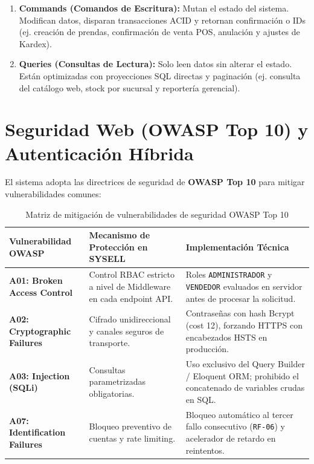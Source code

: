 \begin{enumerate}
    \item \textbf{Commands (Comandos de Escritura):} Mutan el estado del sistema. Modifican datos, disparan transacciones ACID y retornan confirmación o IDs (ej. creación de prendas, confirmación de venta POS, anulación y ajustes de Kardex).
    \item \textbf{Queries (Consultas de Lectura):} Solo leen datos sin alterar el estado. Están optimizadas con proyecciones SQL directas y paginación (ej. consulta del catálogo web, stock por sucursal y reportería gerencial).
\end{enumerate}

\section{Seguridad Web (OWASP Top 10) y Autenticación Híbrida}
El sistema adopta las directrices de seguridad de \textbf{OWASP Top 10} para mitigar vulnerabilidades comunes:

\begin{table}[H]
\centering
\small
\begin{tabularx}{\textwidth}{>{\bfseries}p{3.8cm} >{\raggedright}p{4.8cm} Y}
\toprule
\textbf{Vulnerabilidad OWASP} & \textbf{Mecanismo de Protección en SYSELL} & \textbf{Implementación Técnica} \\
\midrule
A01: Broken Access Control & Control RBAC estricto a nivel de Middleware en cada endpoint API. & Roles \texttt{ADMINISTRADOR} y \texttt{VENDEDOR} evaluados en servidor antes de procesar la solicitud. \\
\addlinespace
A02: Cryptographic Failures & Cifrado unidireccional y canales seguros de transporte. & Contraseñas con hash Bcrypt (cost 12), forzando HTTPS con encabezados HSTS en producción. \\
\addlinespace
A03: Injection (SQLi) & Consultas parametrizadas obligatorias. & Uso exclusivo del Query Builder / Eloquent ORM; prohibido el concatenado de variables crudas en SQL. \\
\addlinespace
A07: Identification Failures & Bloqueo preventivo de cuentas y rate limiting. & Bloqueo automático al tercer fallo consecutivo (\texttt{RF-06}) y acelerador de retardo en reintentos. \\
\bottomrule
\end{tabularx}
\caption{Matriz de mitigación de vulnerabilidades de seguridad OWASP Top 10}
\label{tab:owasp_security}
\end{table}

